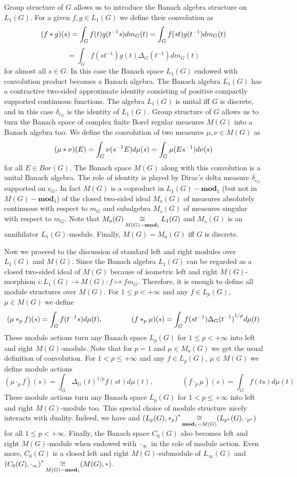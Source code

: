 Group structure of $G$ allows us to introduce the Banach algebra structure on
$L_1(G)$. For a given $f,g\in L_1(G)$ we define their convolution as
$$
(f\ast g)(s)=\int_G f(t)g(t^{-1}s)dm_G(t)=\int_G f(st)g(t^{-1})dm_G(t)
$$
$$=\int_G f(st^{-1})g(t)\Delta_G(t^{-1})dm_G(t)
$$
for almost all $s\in G$. In this case the Banach space $L_1(G)$ endowed with 
convolution product becomes a Banach algebra. The Banach algebra $L_1(G)$ has a 
contractive two-sided approximate identity consisting of positive compactly 
supported continuous functions. The algebra $L_1(G)$ is unital iff $G$ is 
discrete, and in this case $\delta_{e_G}$ is the identity of $L_1(G)$. 
Group structure of $G$ allows us to turn the Banach space of complex finite 
Borel regular measures $M(G)$ into a Banach algebra too. We define the 
convolution of two measures $\mu,\nu\in M(G)$ as
$$
(\mu\ast \nu)(E)=\int_G\nu(s^{-1}E)d\mu(s)=\int_G\mu(Es^{-1})d\nu(s)
$$
for all $E\in Bor(G)$. The Banach space $M(G)$ along with this convolution is 
a unital Banach algebra. The role of identity is played by Dirac's delta 
measure $\delta_{e_G}$ supported on $e_G$. In fact $M(G)$ is a coproduct 
in $L_1(G)-\mathbf{mod}_1$ (but not in $M(G)-\mathbf{mod}_1$) of the 
closed two-sided ideal $M_a(G)$ of measures absolutely continuous with 
respect to $m_G$ and  subalgebra $M_s(G)$ of measures singular with 
respect to $m_G$. Note that $M_a(G)\mathop{\mathbin{\cong}}\limits_{M(G)-\mathbf{mod}_1}L_1(G)$ 
and $M_s(G)$ is an annihilator $L_1(G)$-module. 
Finally, $M(G)=M_a(G)$ iff $G$ is discrete. 

Now we proceed to the discussion of standard left and right modules 
over $L_1(G)$ and $M(G)$. Since the Banach algebra $L_1(G)$ can be 
regarded as a closed two-sided ideal  of $M(G)$ because of isometric 
left and right $M(G)$-morphism $i:L_1(G)\to M(G):f\mapsto f m_G$. 
Therefore, it is enough to define all module structures over $M(G)$. 
For $1\leq p<+\infty$ and any $f\in L_p(G)$, $\mu\in M(G)$ we define
$$
(\mu\ast_p f)(s)=\int_G f(t^{-1}s)d\mu(t), \qquad\qquad (f\ast_p
\mu)(s)=\int_G f(st^{-1}){\Delta_G(t^{-1})}^{1/p}d\mu(t)
$$
These module actions turn any Banach space $L_p(G)$ for $1\leq p<+\infty$ into 
left and right $M(G)$-module. Note that for $p=1$ and $\mu\in M_a(G)$ we 
get the usual definition of convolution. For $1<p\leq +\infty$ and 
any $f\in L_p(G)$, $\mu\in M(G)$ we define module actions
$$
(\mu\cdot_p f)(s)=\int_G {\Delta_G(t)}^{1/p}f(st)d\mu(t), \qquad\qquad (f\cdot_p
\mu)(s)=\int_G f(ts)d\mu(t)
$$
These module actions turn any Banach space $L_p(G)$ for $1<p\leq+\infty$ into 
left and right $M(G)$-module too. This special choice of module structure 
nicely interacts with duality. Indeed, we have 
and ${(L_p(G),\ast_p)}^*\mathop{\mathbin{\cong}}\limits_{\mathbf{mod}_1-M(G)}(L_{p^*}(G),\cdot_{p^*})$ 
for all $1\leq p<+\infty$. Finally, the Banach space $C_0(G)$ also becomes left 
and right $M(G)$-module when endowed with $\cdot_\infty$ in the role of module 
action. Even more, $C_0(G)$ is a closed left and right $M(G)$-submodule 
of $L_\infty(G)$ 
and ${(C_0(G),\cdot_\infty)}^*\mathop{\mathbin{\cong}}\limits_{M(G)-\mathbf{mod}_1}(M(G),\ast)$.

